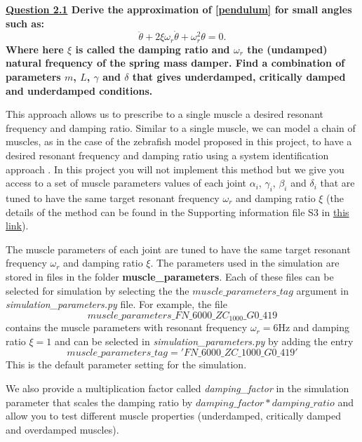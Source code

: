 \documentclass{cmc}
\begin{document}
\textbf{\underline{Question 2.1} Derive the approximation of \ref{pendulum} for small angles such as:
$$ \ddot{\theta} + 2 \xi \omega_r \dot{\theta} + \omega_r^2 \theta = 0. $$
Where here $\xi$ is called the damping ratio and $\omega_r$ the (undamped) natural frequency of the spring mass damper. Find a combination of parameters $m$, $L$, $\gamma$ and $\delta$ that gives underdamped, critically damped and underdamped conditions.}


This approach allows us to prescribe to a single muscle a desired resonant frequency and damping ratio. Similar to a single muscle, we can model a chain of muscles, as in the case of the zebrafish model proposed in this project, to have a desired resonant frequency and damping ratio using a system identification approach \cite{pazzaglia2025balancing}. In this project you will not implement this method but we give you access to a set of muscle parameters values of each joint $\alpha_i$, $\gamma_i$, $\beta_i$ and $\delta_i$ that are tuned to have the same target resonant frequency $\omega_r$ and damping ratio $\xi$ (the details of the method can be found in the Supporting information file S3 in \href{https://journals.plos.org/ploscompbiol/article?id=10.1371/journal.pcbi.1012101}{this link}).


The muscle parameters of each joint are tuned to have the same target resonant frequency $\omega_r$ and damping ratio $\xi$. The parameters used in the simulation are stored in files in the folder \textbf{muscle\_parameters}. Each of these files can be selected for simulation by selecting the the $muscle\_parameters\_tag$ argument in \textit{simulation\_parameters.py} file. For example, the file
$$ muscle\_parameters\_FN\_6000\_ZC_1000\_G0\_419 $$
contains the muscle parameters with resonant frequency $\omega_r=6$Hz and damping ratio $\xi=1$ and can be selected in \textit{simulation\_parameters.py} by adding the entry
$$ muscle\_parameters\_tag = 'FN\_6000\_ZC\_1000\_G0\_419' $$
This is the default parameter setting for the simulation.

We also provide a multiplication factor called \textit{damping\_factor} in the simulation parameter that scales the damping ratio by $damping\_factor*damping\_ratio$ and allow you to test different muscle properties (underdamped, critically damped and overdamped muscles).
\end{document}
